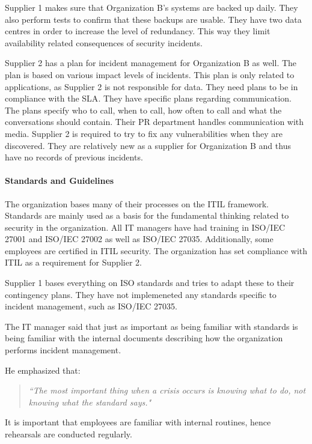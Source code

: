 \documentclass[b5paper, twoside, openright, 11pt]{report}
\begin{document}
Supplier 1 makes sure that Organization B's systems are backed up daily. They also perform tests to confirm that these backups are usable. They have two data centres in order to increase the level of redundancy. This way they limit availability related consequences of security incidents.

Supplier 2 has a plan for incident management for Organization B as well. The plan is based on various impact levels of incidents. This plan is only related to applications, as Supplier 2 is not responsible for data. They need plans to be in compliance with the \ac{SLA}. They have specific plans regarding communication. The plans specify who to call, when to call, how often to call and what the conversations should contain. Their PR department handles communication with media. Supplier 2 is required to try to fix any vulnerabilities when they are discovered. They are relatively new as a supplier for Organization B and thus have no records of previous incidents.

\paragraph{Standards and Guidelines}
The organization bases many of their processes on the ITIL framework. Standards are mainly used as a basis for the fundamental thinking related to security in the organization. All IT managers have had training in ISO/IEC 27001 and ISO/IEC 27002 as well as ISO/IEC 27035. Additionally, some employees are certified in ITIL security. The organization has set compliance with \ac{ITIL} as a requirement for Supplier 2. %

Supplier 1 bases everything on \acs{ISO} standards and tries to adapt these to their contingency plans. They have not implemeneted any standards specific to incident management, such as \acs{ISO}/\acs{IEC} 27035. 

The IT manager said that just as important as being familiar with standards is being familiar with the internal documents describing how the organization performs incident management. 

He emphasized that:
\begin{quote}
\textit{``The most important thing when a crisis occurs is knowing what to do, not knowing what the standard says."}
\end{quote}
It is important that employees are familiar with internal routines, hence rehearsals are conducted regularly.
\end{document}

